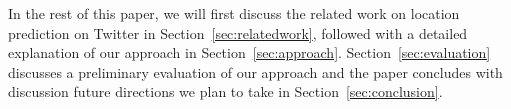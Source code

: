 In the rest of this paper, we will first discuss the related work on location prediction on Twitter in Section~\ref{sec:relatedwork}, followed with a detailed explanation of our approach in Section~\ref{sec:approach}. Section~\ref{sec:evaluation} discusses a preliminary evaluation of our approach and the paper concludes with discussion future directions we plan to take in Section~\ref{sec:conclusion}. 
 
 








